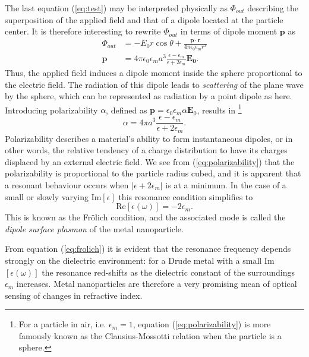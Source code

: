 The last equation (\ref{eq:test}) may be interpreted physically as $\Phi_{out}$ describing the superposition of the applied field and that of a dipole located at the particle center. It is therefore interesting to rewrite $\Phi_{out}$ in terms of dipole moment $\mathbf{p}$ as
\begin{subequations}
\begin{align}
        \Phi_{out} &= -E_0 r \cos\theta + \frac{\mathbf{p}\cdot \mathbf{r}}{4\pi\epsilon_0\epsilon_mr^3}    \\
        \mathbf{p} &= 4\pi\epsilon_0\epsilon_m a^3 \frac{\epsilon-\epsilon_m}{\epsilon+2\epsilon_m} \mathbf{E_0}.
    \end{align}
    \label{eq:LSPR_dipolemoment}
\end{subequations}
Thus, the applied field induces a dipole moment inside the sphere proportional to the electric field. The radiation of this dipole leads to \emph{scattering} of the plane wave by the sphere, which can be represented as radiation by a point dipole as here. Introducing polarizability $\alpha$, defined as $\mathbf{p}=\epsilon_0\epsilon_m\alpha\mathbf{E}_0$, results in \footnote{For a particle in air, i.e. $\epsilon_m=1$, equation (\ref{eq:polarizability}) is more famously known as the Clausius-Mossotti relation when the particle is a sphere.}
\begin{equation}
    \alpha = 4\pi a^3 \frac{\epsilon-\epsilon_m}{\epsilon+2\epsilon_m}.
    \label{eq:polarizability}
\end{equation}
Polarizability describes a material's ability to form instantaneous dipoles, or in other words, the relative tendency of a charge distribution to have its charges displaced by an external electric field. We see from (\ref{eq:polarizability}) that the polarizability is proportional to the particle radius cubed, and it is apparent that a resonant behaviour occurs when $|\epsilon+2\epsilon_m|$ is at a minimum. In the case of a small or slowly varying $\text{Im}[\epsilon]$ this resonance condition simplifies to 
\begin{equation}
    \text{Re}[\epsilon(\omega)] = -2\epsilon_m.
    \label{eq:frolich}
\end{equation}
This is known as the Frölich condition, and the associated mode is called the \emph{dipole surface plasmon} of the metal nanoparticle\cite{maier}.

From equation (\ref{eq:frolich}) it is evident that the resonance frequency depends strongly on the dielectric environment: for a Drude metal with a small Im$[\epsilon(\omega)]$ the resonance red-shifts as the dielectric constant of the surroundings $\epsilon_m$ increases. Metal nanoparticles are therefore a very promising mean of optical sensing of changes in refractive index.

